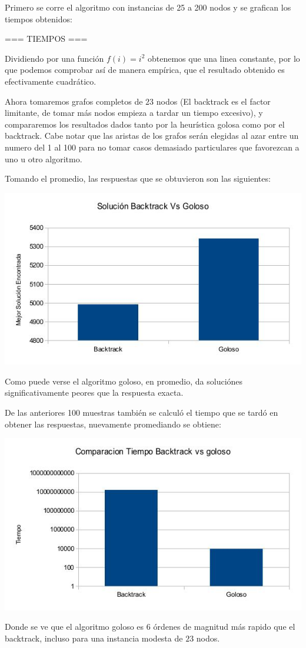 Primero se corre el algoritmo con instancias de 25 a 200 nodos y se grafican los tiempos obtenidos:

=== TIEMPOS ===

Dividiendo por una función $f(i) = i^2$ obtenemos que una linea constante, por lo que podemos comprobar así de manera empírica, que el resultado obtenido es efectivamente cuadrático.

Ahora tomaremos grafos completos de $23$ nodos (El backtrack es el factor limitante, de tomar más nodos empieza a tardar un tiempo excesivo), y compararemos los resultados dados tanto por la heurística golosa como por el backtrack. Cabe notar que las aristas de los grafos serán elegidas al azar entre un numero del 1 al 100 para no tomar casos demasiado particulares que favorezcan a uno u otro algoritmo.

Tomando el promedio, las respuestas que se obtuvieron son las siguientes:

\includegraphics[scale=0.5]{Ej3/Soluciones.jpg}

Como puede verse el algoritmo goloso, en promedio, da soluciónes significativamente peores que la respuesta exacta.

De las anteriores 100 muestras también se calculó el tiempo que se tardó en obtener las respuestas, nuevamente promediando se obtiene:

\includegraphics[scale=0.5]{Ej3/tiempos.jpg}

Donde se ve que el algoritmo goloso es $6$ órdenes de magnitud más rapido que el backtrack, incluso para una instancia modesta de $23$ nodos.
